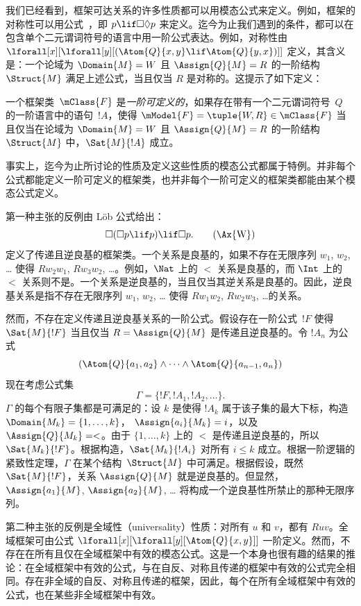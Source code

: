 \documentclass[../../../include/open-logic-section]{subfiles}
\begin{document}


我们已经看到，框架可达关系的许多性质都可以用模态公式来定义。例如，框架的对称性可以用公式~，即 $p \lif \Box\Diamond p$ 来定义。迄今为止我们遇到的条件，都可以在包含单个二元谓词符号的语言中用一阶公式表达。例如，对称性由
$\lforall[x][\lforall[y][(\Atom{Q}{x,y} \lif \Atom{Q}{y, x})]]$ 定义，其含义是：一个论域为 $\Domain{M} = W$ 且 $\Assign{Q}{M} = R$ 的一阶结构~$\Struct{M}$ 满足上述公式，当且仅当 $R$ 是对称的。这提示了如下定义：

\begin{defn}
  一个框架类~$\mClass{F}$ 是\emph{一阶可定义的}，如果存在带有一个二元谓词符号~$Q$ 的一阶语言中的语句~$!A$，使得 $\mModel{F} =
  \tuple{W, R} \in \mClass{F}$ 当且仅当在论域为 $\Domain{M} = W$ 且 $\Assign{Q}{M} = R$ 的一阶结构~$\Struct{M}$ 中，$\Sat{M}{!A}$ 成立。
\end{defn}

事实上，迄今为止所讨论的性质及定义这些性质的模态公式都属于特例。并非每个公式都能定义一阶可定义的框架类，也并非每个一阶可定义的框架类都能由某个模态公式定义。

第一种主张的反例由 L\"ob 公式给出：\begin{equation}
\Box(\Box p \lif p) \lif \Box p. \tag{\Ax{W}}
\end{equation}
 定义了传递且逆良基的框架类。一个关系是良基的，如果不存在无限序列 $w_1$, $w_2$, \dots{} 使得 $Rw_2w_1$, $Rw_3w_2$, \dots。例如，$\Nat$ 上的 $<$ 关系是良基的，而 $\Int$ 上的 $<$ 关系则不是。一个关系是逆良基的，当且仅当其逆关系是良基的。因此，逆良基关系是指不存在无限序列 $w_1$, $w_2$, \dots{} 使得 $Rw_1w_2$, $Rw_2w_3$, \dots 的关系。

然而，不存在定义传递且逆良基关系的一阶公式。假设存在一阶公式~$!F$ 使得 $\Sat{M}{!F}$ 当且仅当 $R = \Assign{Q}{M}$ 是传递且逆良基的。令 $!A_n$ 为公式
\[
(\Atom{Q}{a_1,a_2} \land \dots \land
    \Atom{Q}{a_{n-1},a_{n}})
\]
现在考虑公式集
\[
\Gamma = \{!F, !A_1, !A_2, \dots\}.
\]
$\Gamma$ 的每个有限子集都是可满足的：设 $k$ 是使得 $!A_k$ 属于该子集的最大下标，构造 $\Domain{M_k} = \{1, \dots, k\}$，
$\Assign{a_i}{M_k} = i$，以及 $\Assign{Q}{M_k} = <$。由于 $\{1, \dots, k\}$ 上的 $<$ 是传递且逆良基的，所以 $\Sat{M_k}{!F}$。根据构造，$\Sat{M_k}{!A_i}$ 对所有 $i \le k$ 成立。根据一阶逻辑的紧致性定理，$\Gamma$ 在某个结构~$\Struct{M}$ 中可满足。根据假设，既然 $\Sat{M}{!F}$，关系 $\Assign{Q}{M}$ 就是逆良基的。但显然，$\Assign{a_1}{M}$, $\Assign{a_2}{M}$, \dots{} 将构成一个逆良基性所禁止的那种无限序列。

第二种主张的反例是全域性（universality）性质：对所有 $u$ 和 $v$，都有 $Ruv$。全域框架可由公式 $\lforall[x][\lforall[y][\Atom{Q}{x,y}]]$ 一阶定义。然而，不存在在所有且仅在全域框架中有效的模态公式。这是一个本身也很有趣的结果的推论：在全域框架中有效的公式，与在自反、对称且传递的框架中有效的公式完全相同。存在非全域的自反、对称且传递的框架，因此，每个在所有全域框架中有效的公式，也在某些非全域框架中有效。
\end{document}
